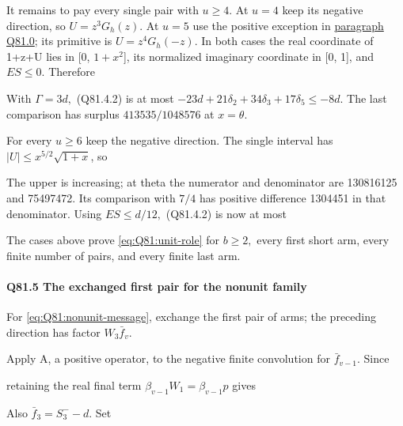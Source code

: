 It remains to pay every single pair with \(u\ge 4.\) At \(u=4\) keep its
negative direction, so \(U=z^3G_h(z)\). At \(u=5\) use the positive
exception in \hyperref[part:Q81:local-roles]{paragraph Q81.0}; its primitive is
\(U=z^4G_h(-z)\). In both cases the real coordinate of 1+z+U
lies in [0, \(1+x^2\)], its normalized imaginary coordinate in [0, 1],
and \(ES\le 0.\) Therefore


With \(\Gamma=3d,\allowbreak \) (Q81.4.2) is at most
\(-23d+21\delta_2+34\delta_3+17\delta_5\le-8d\).
The last comparison has surplus \(413535/1048576\) at \(x=\theta.\)

For every \(u\ge 6\) keep the negative direction. The single interval has
\(|U|\le x^{5/2}\sqrt{1+x}\), so


The upper is increasing; at theta the numerator and denominator are
130816125 and 75497472. Its comparison with \(7/4\) has positive
difference 1304451 in that denominator. Using \(ES\le d/12,\allowbreak \)
(Q81.4.2) is now at most


The cases above prove \eqref{eq:Q81:unit-role} for \(b\ge 2,\allowbreak \) every first short arm,
every finite number of pairs, and every finite last arm.

\paragraph{Q81.5 The exchanged first pair for the nonunit family}

For \eqref{eq:Q81:nonunit-message}, exchange the first pair of arms; the preceding direction has factor \(W_3\bar f_v\).

Apply A, a positive operator, to the negative finite convolution for
\(\bar f_{v-1}\). Since


retaining the real final term \(\beta_{v-1}W_1=\beta_{v-1}p\) gives


Also \(\bar f_3=S_3^- -d\). Set


